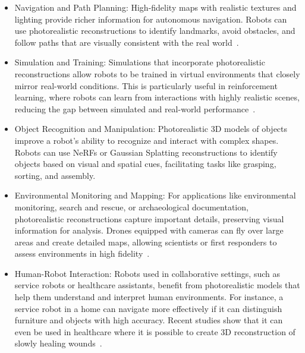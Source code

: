 \begin{itemize}
    \item Navigation and Path Planning: High-fidelity maps with realistic textures and lighting provide richer information for autonomous navigation. Robots can use photorealistic reconstructions to identify landmarks, avoid obstacles, and follow paths that are visually consistent with the real world~\cite{active_splat}.
    \item Simulation and Training: Simulations that incorporate photorealistic reconstructions allow robots to be trained in virtual environments that closely mirror real-world conditions. This is particularly useful in reinforcement learning, where robots can learn from interactions with highly realistic scenes, reducing the gap between simulated and real-world performance~\cite{reinforcement_learning_robot}.
    \item Object Recognition and Manipulation: Photorealistic 3D models of objects improve a robot's ability to recognize and interact with complex shapes. Robots can use NeRFs or Gaussian Splatting reconstructions to identify objects based on visual and spatial cues, facilitating tasks like grasping, sorting, and assembly.
    \item Environmental Monitoring and Mapping: For applications like environmental monitoring, search and rescue, or archaeological documentation, photorealistic reconstructions capture important details, preserving visual information for analysis. Drones equipped with cameras can fly over large areas and create detailed maps, allowing scientists or first responders to assess environments in high fidelity~\cite{drone_3d_reconstruction}.
    \item Human-Robot Interaction: Robots used in collaborative settings, such as service robots or healthcare assistants, benefit from photorealistic models that help them understand and interpret human environments. For instance, a service robot in a home can navigate more effectively if it can distinguish furniture and objects with high accuracy. Recent studies show that it can even be used in healthcare where it is possible to create 3D reconstruction of slowly healing wounds~\cite{3d_reconstruction_wounds}.
\end{itemize}
